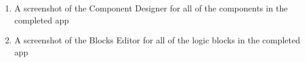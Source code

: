 \begin{enumerate}
	\item A screenshot of the Component Designer for all of the components in the completed app
	\item A screenshot of the Blocks Editor for all of the logic blocks in the completed app 
\end{enumerate}

% 
% 		
% 
% 
% 
% 
% 

